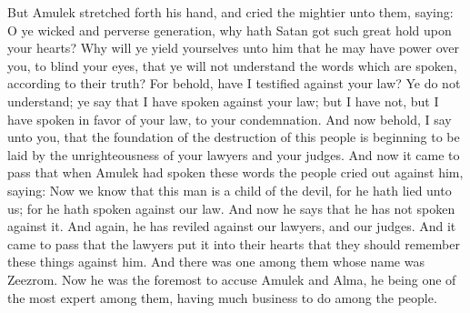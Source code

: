 But Amulek stretched forth his hand, and cried the mightier unto them, saying: O ye wicked and perverse generation, why hath Satan got such great hold upon your hearts? Why will ye yield yourselves unto him that he may have power over you, to blind your eyes, that ye will not understand the words which are spoken, according to their truth?
\bverse \iffalse For behold, have I testified against your law? Ye do not understand; ye say that I have spoken against your law; but I have not, but I have spoken in favor of your law, to your condemnation. \fi
For behold, have I testified against your law? Ye do not understand; ye say that I have spoken against your law; but I have not, but I have spoken in favor of your law, to your condemnation.
\bverse \iffalse And now behold, I say unto you, that the foundation of the destruction of this people is beginning to be laid by the unrighteousness of your lawyers and your judges. \fi
And now behold, I say unto you, that the foundation of the destruction of this people is beginning to be laid by the unrighteousness of your lawyers and your judges.
\bverse \iffalse And now it came to pass that when Amulek had spoken these words the people cried out against him, saying: Now we know that this man is a child of the devil, for he hath lied unto us; for he hath spoken against our law. And now he says that he has not spoken against it. \fi
And now it came to pass that when Amulek had spoken these words the people cried out against him, saying: Now we know that this man is a child of the devil, for he hath lied unto us; for he hath spoken against our law. And now he says that he has not spoken against it.
\bverse \iffalse And again, he has reviled against our lawyers, and our judges. \fi
And again, he has reviled against our lawyers, and our judges.
\bverse \iffalse And it came to pass that the lawyers put it into their hearts that they should remember these things against him. \fi
And it came to pass that the lawyers put it into their hearts that they should remember these things against him.
\bverse \iffalse And there was one among them whose name was Zeezrom. Now he was the foremost to accuse Amulek and Alma, he being one of the most expert among them, having much business to do among the people. \fi
And there was one among them whose name was Zeezrom. Now he was the foremost to accuse Amulek and Alma, he being one of the most expert among them, having much business to do among the people.
\bverse \iffalse Now the object of these lawyers was to get gain; and they got gain according to their employ. \fi
